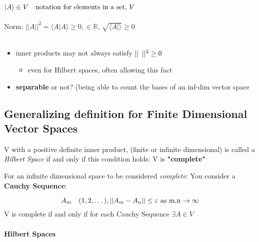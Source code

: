 \documentclass[svgnames]{article}   	%
\begin{document}
\noindent $
  | A \rangle \in V \hspace{10px} \text{notation for elements in a set, } V
$ \mbox{} \\\\
Norm: $|| A || ^2 = \langle A | A \rangle \geq 0, \in \mathbb{R}$,
$ \sqrt{\langle A | \rangle} \geq 0$
\mbox{}\\\\
\begin{tcolorbox}[colback = red!5!white, colframe = red!50!black, title
  = Warnings]
  
  \begin{itemize}
    \item inner products may not always satisfy $ || \hspace{5px} ||^2 \geq 0$ 
      \begin{itemize}
        \item even for Hilbert spaces, often allowing this fact
      \end{itemize}
    \item \textbf{separable} or not? (being able to count the bases of an
      inf-dim vector space
  \end{itemize}

\end{tcolorbox}

\subsection{Generalizing definition for Finite Dimensional Vector Spaces}

V with a positive definite inner product, (finite or infinite dimensional) is called
a \textit{Hilbert Space} if and only if this condition holds: V is
\textbf{"complete"}
\vspace{5px}

For an infinite dimensional space to be considered \textit{complete}: You
consider a \textbf{Cauchy Sequence}: 

\[
A_m \hspace{10px} (1,2,\dots), || A_m - A_n || \leq \varepsilon \text{ as m,n
$\rightarrow \infty$}
\] \vspace{5px}
V is complete if and only if for each Cauchy Sequence $\exists A \in V$

\paragraph{Hilbert Spaces} 
\end{document}
